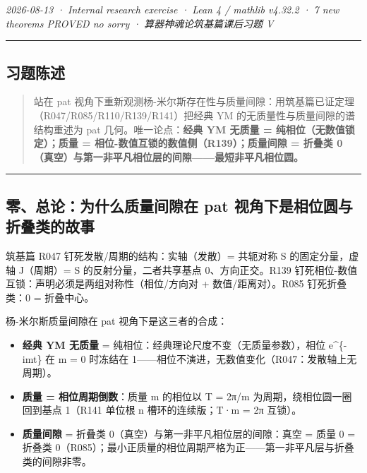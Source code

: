 \documentclass[
]{article}
\providecommand{\tightlist}{%
  \setlength{\itemsep}{0pt}\setlength{\parskip}{0pt}}
\begin{document}
\emph{2026-08-13 · Internal research exercise · Lean 4 / mathlib v4.32.2
· 7 new theorems PROVED no sorry · 算器神魂论筑基篇课后习题 V }

\begin{center}\rule{0.5\linewidth}{0.5pt}\end{center}

\subsection{习题陈述}\label{ux4e60ux9898ux9648ux8ff0}

\begin{quote}
站在 pat
视角下重新观测杨-米尔斯存在性与质量间隙：用筑基篇已证定理（R047/R085/R110/R139/R141）把经典
YM 的无质量性与质量间隙的谱结构重述为 pat 几何。唯一论点：\textbf{经典
YM 无质量 = 纯相位（无数值锁定）；质量 =
相位-数值互锁的数值侧（R139）；质量间隙 = 折叠类
0（真空）与第一非平凡相位层的间隙------最短非平凡相位圆。}
\end{quote}

\begin{center}\rule{0.5\linewidth}{0.5pt}\end{center}

\subsection{零、总论：为什么质量间隙在 pat
视角下是相位圆与折叠类的故事}\label{ux96f6ux603bux8bbaux4e3aux4ec0ux4e48ux8d28ux91cfux95f4ux9699ux5728-pat-ux89c6ux89d2ux4e0bux662fux76f8ux4f4dux5706ux4e0eux6298ux53e0ux7c7bux7684ux6545ux4e8b}

筑基篇 R047 钉死发散/周期的结构：实轴（发散）= 共轭对称 S
的固定分量，虚轴 J（周期）= S 的反射分量，二者共享基点 0、方向正交。R139
钉死相位-数值互锁：声明必须是两组对称性（相位/方向对 +
数值/距离对）。R085 钉死折叠类：0 = 折叠中心。

杨-米尔斯质量间隙在 pat 视角下是这三者的合成：

\begin{itemize}
\tightlist
\item
  \textbf{经典 YM 无质量} = 纯相位：经典理论尺度不变（无质量参数），相位
  e\^{}\{-imt\} 在 m = 0 时冻结在
  1------相位不演进，无数值变化（R047：发散轴上无周期）。
\item
  \textbf{质量 = 相位周期倒数}：质量 m 的相位以 T = 2π/m
  为周期，绕相位圆一圈回到基点 1（R141 单位根 n 槽环的连续版；T·m = 2π
  互锁）。
\item
  \textbf{质量间隙} = 折叠类 0（真空）与第一非平凡相位层的间隙：真空 =
  质量 0 = 折叠类
  0（R085）；最小正质量的相位周期严格为正------第一非平凡层与折叠类的间隙非零。
\end{itemize}
\end{document}
